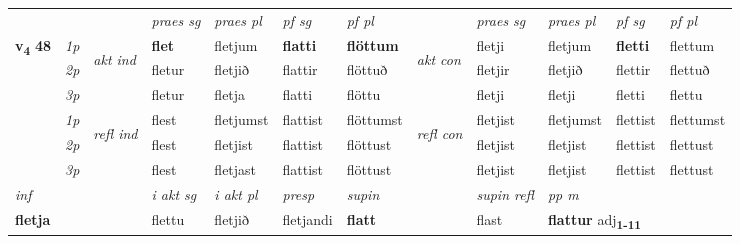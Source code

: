 \begin{longtable}[l]{X>{\footnotesize\itshape}llXXXXlXXXX}
 & &   & \textit{praes sg}  & \textit{praes pl}    & \textit{ pf sg} & \textit{pf pl} & & \textit{praes sg}  & \textit{praes pl}    & \textit{pf sg} & \textit{pf pl }  \\ \cmidrule{4-7} \cmidrule{9-12}
 \multirow{2}{*}{{{\textbf{v{\textsubscript{4}}} \Large{\textbf{48}}}}}  & 1p & \multirow{3}{*}{\begin{turn}{90}\textit{akt ind}\end{turn}} & \textbf{flet} & fletjum & \textbf{flatti} & \textbf{flöttum} & \multirow{3}{*}{\begin{turn}{90}\textit{akt con}\end{turn}} &fletji & fletjum & \textbf{fletti} & flettum\\*
 & 2p &  &  fletur  & fletjið & flattir & flöttuð & & fletjir & fletjið & flettir & flettuð \\*
 & 3p &  & fletur & fletja & flatti & flöttu & & fletji & fletji& fletti & flettu \\*
\cmidrule{4-7} \cmidrule{9-12}
 & 1p & \multirow{3}{*}{\begin{turn}{90}\textit{refl ind}\end{turn}}  & flest & fletjumst & flattist & flöttumst & \multirow{3}{*}{\begin{turn}{90}\textit{refl con}\end{turn}}  &fletjist & fletjumst & flettist & flettumst \\*
 & 2p &  & flest & fletjist & flattist & flöttust & &fletjist & fletjist & flettist & flettust \\*
 & 3p  & & flest & fletjast & flattist & flöttust & & fletjist & fletjist& flettist & flettust \\*
\cmidrule{4-7} \cmidrule{9-12}

   {\textit{inf}} & &  & \textit{i akt sg} & \textit{i akt pl}   & \textit{presp} & \textit{supin} && \textit{supin refl} & \textit{pp m} \\*
  {\textbf{fletja}} & && flettu  & fletjið   & fletjandi &  \textbf{flatt} && flast & \multicolumn{2}{l}{\textbf{flattur} adj\textbf{\textsubscript{1-11}}} \\*

\midrule


\end{longtable}
